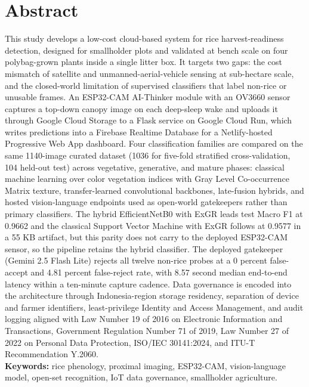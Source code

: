 \chapter*{Abstract}
\vspace*{0.7cm}

\noindent This study develops a low-cost cloud-based system for rice harvest-readiness detection, designed for smallholder plots and validated at bench scale on four polybag-grown plants inside a single litter box. It targets two gaps: the cost mismatch of satellite and unmanned-aerial-vehicle sensing at sub-hectare scale, and the closed-world limitation of supervised classifiers that label non-rice or unusable frames. An ESP32-CAM AI-Thinker module with an OV3660 sensor captures a top-down canopy image on each deep-sleep wake and uploads it through Google Cloud Storage to a Flask service on Google Cloud Run, which writes predictions into a Firebase Realtime Database for a Netlify-hosted Progressive Web App dashboard. Four classification families are compared on the same 1140-image curated dataset (1036 for five-fold stratified cross-validation, 104 held-out test) across vegetative, generative, and mature phases: classical machine learning over color vegetation indices with Gray Level Co-occurrence Matrix texture, transfer-learned convolutional backbones, late-fusion hybrids, and hosted vision-language endpoints used as open-world gatekeepers rather than primary classifiers. The hybrid EfficientNetB0 with ExGR leads test Macro F1 at 0.9662 and the classical Support Vector Machine with ExGR follows at 0.9577 in a 55 KB artifact, but this parity does not carry to the deployed ESP32-CAM sensor, so the pipeline retains the hybrid classifier. The deployed gatekeeper (Gemini 2.5 Flash Lite) rejects all twelve non-rice probes at a 0 percent false-accept and 4.81 percent false-reject rate, with 8.57 second median end-to-end latency within a ten-minute capture cadence. Data governance is encoded into the architecture through Indonesia-region storage residency, separation of device and farmer identifiers, least-privilege Identity and Access Management, and audit logging aligned with Law Number 19 of 2016 on Electronic Information and Transactions, Government Regulation Number 71 of 2019, Law Number 27 of 2022 on Personal Data Protection, ISO/IEC 30141:2024, and ITU-T Recommendation Y.2060.
\vspace{0.2in}
 \noindent
\\ \textbf{Keywords:} rice phenology, proximal imaging, ESP32-CAM, vision-language model, open-set recognition, IoT data governance, smallholder agriculture.

